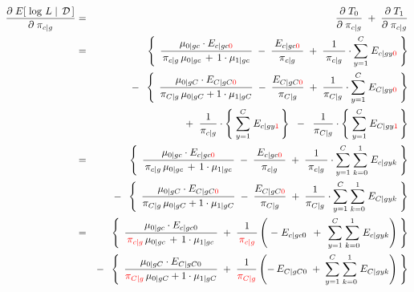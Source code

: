 \begin{eqnarray*}
\dfrac{\partial\;E\!\left[\,\left.\log\,L\;\right\vert\;\mathcal{D}\,\right]}{\partial\;\pi_{c \vert g}}
&=& \dfrac{\partial\;T_{0}}{\partial\;\pi_{c \vert g}} \;+\; \dfrac{\partial\;T_{1}}{\partial\;\pi_{c \vert g}}
\\
&=&
	{\color{white}-} \;\;
	\left\{\;\,
		\dfrac{\mu_{0 \vert gc}\cdot E_{c \vert gc{\color{red}0}}}{\mbox{}\,\pi_{c \vert g}\,\mu_{0 \vert gc} \,+\, 1\cdot\mu_{1\vert gc}\,\mbox{}}
		\;-\;
		\dfrac{\mbox{}\;E_{c \vert gc{\color{red}0}}\;\mbox{}}{\mbox{}\;\pi_{c \vert g}\;\mbox{}}
		\;+\;
		\dfrac{1}{\mbox{}\;\pi_{c \vert g}\;\mbox{}}
		\cdot
		\overset{C}{\underset{y=1}{\sum}}\; E_{c \vert gy{\color{red}0}}
	\;\right\}
\\
&&
	- \;\;
	\left\{\;\,
		\dfrac{\mu_{0 \vert gC} \cdot E_{C \vert gC{\color{red}0}}}{\pi_{C \vert g}\,\mu_{0 \vert gC}+1\cdot\mu_{1\vert gC}}
		\;-\;
		\dfrac{E_{C \vert gC{\color{red}0}}}{\pi_{C \vert g}}
		\;+\;
		\dfrac{1}{\pi_{C \vert g}}
		\cdot
		\overset{C}{\underset{y=1}{\sum}}\; E_{C \vert gy{\color{red}0}}
	\;\right\}
\\
&&
	+ \;\;
	\dfrac{1}{\pi_{c \vert g}}
	\cdot
	\left\{\;
		\overset{C}{\underset{y=1}{\sum}}\;
		E_{c \vert gy{\color{red}1}}
	\,\right\}
	\;\; - \;\;
	\dfrac{1}{\pi_{C \vert g}}
	\cdot
	\left\{\;
		\overset{C}{\underset{y=1}{\sum}}\;
		E_{C \vert gy{\color{red}1}}
	\,\right\}
\\
&=&
	{\color{white}-} \;\;
	\left\{\;\,
		\dfrac{\mu_{0 \vert gc}\cdot E_{c \vert gc{\color{red}0}}}{\mbox{}\,\pi_{c \vert g}\,\mu_{0 \vert gc} \,+\, 1\cdot\mu_{1\vert gc}\,\mbox{}}
		\;-\;
		\dfrac{\mbox{}\;E_{c \vert gc{\color{red}0}}\;\mbox{}}{\mbox{}\;\pi_{c \vert g}\;\mbox{}}
		\;+\;
		\dfrac{1}{\mbox{}\;\pi_{c \vert g}\;\mbox{}}
		\cdot
		\overset{C}{\underset{y=1}{\sum}} \; \overset{1}{\underset{k=0}{\sum}} \; E_{c \vert gyk}
	\;\right\}
\\
&&
	- \;\;
	\left\{\;\,
		\dfrac{\mu_{0 \vert gC} \cdot E_{C \vert gC{\color{red}0}}}{\pi_{C \vert g}\,\mu_{0 \vert gC}+1\cdot\mu_{1\vert gC}}
		\;-\;
		\dfrac{E_{C \vert gC{\color{red}0}}}{\pi_{C \vert g}}
		\;+\;
		\dfrac{1}{\pi_{C \vert g}}
		\cdot
		\overset{C}{\underset{y=1}{\sum}} \; \overset{1}{\underset{k=0}{\sum}} \; E_{C \vert gyk}
	\;\right\}
\\
&=&
	{\color{white}-} \;\;
	\left\{\;\,
		\dfrac{\mu_{0 \vert gc}\cdot E_{c \vert gc0}}{\mbox{}\,{\color{red}\pi_{c \vert g}}\,\mu_{0 \vert gc} \,+\, 1\cdot\mu_{1\vert gc}\;\mbox{}}
		\;+\;
		\dfrac{1}{\mbox{}\,{\color{red}\pi_{c \vert g}}\,\mbox{}}
		\left(
			\;-\;E_{c \vert gc0}
			\,\;+\;\,
			\overset{C}{\underset{y=1}{\sum}} \; \overset{1}{\underset{k=0}{\sum}} \; E_{c \vert gyk}
		\right)
	\;\right\}
\\
&&
	- \;\;
	\left\{\;\,
		\dfrac{\mu_{0 \vert gC} \cdot E_{C \vert gC0}}{{\color{red}\pi_{C \vert g}}\,\mu_{0 \vert gC}+1\cdot\mu_{1\vert gC}}
		\;+\;
		\dfrac{1}{{\color{red}\pi_{C \vert g}}}
		\left(
			-\,E_{C \vert gC0}
			\;+\;
			\overset{C}{\underset{y=1}{\sum}} \; \overset{1}{\underset{k=0}{\sum}} \; E_{C \vert gyk}
		\right)
	\;\right\}
\end{eqnarray*}

